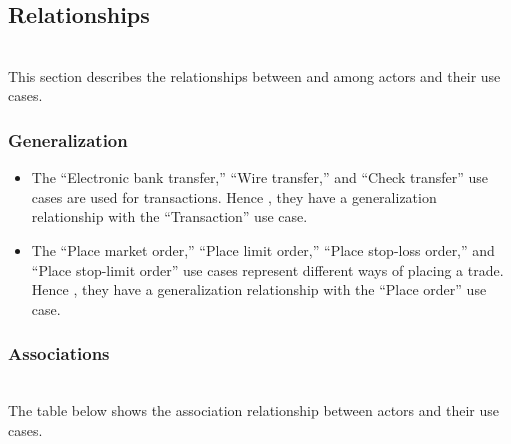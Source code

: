 \subsection{Relationships}\label{D3hZLqMBzqwDLmqdnsAhS}
\\
This section describes the relationships between and among actors and their use cases.

\subsubsection{Generalization}\label{RQn68c6ubywz34gS3wiSe}

\begin{itemize}
\item
\protect{}\label{juKmJdniVmuJ-MDG_996P}
The ``Electronic bank transfer,'' ``Wire transfer,'' and ``Check transfer'' use cases are used for transactions. Hence , they have a generalization relationship with the ``Transaction'' use case.
\item
\protect{}\label{O9_z53EIlPK7_K6DSCIvr}
The ``Place market order,'' ``Place limit order,'' ``Place stop-loss order,'' and ``Place stop-limit order'' use cases represent different ways of placing a trade. Hence , they have a generalization relationship with the ``Place order'' use case.
\end{itemize}

\subsubsection{Associations}\label{_WolsXwKYMT-rI2iy89bE}
\\
The table below shows the association relationship between actors and their use cases.

